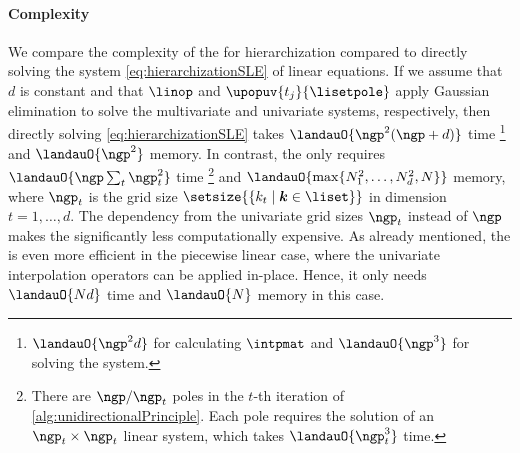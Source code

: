 \paragraph{Complexity}

We compare the complexity of the \up for hierarchization compared
to directly solving the system \eqref{eq:hierarchizationSLE} of
linear equations.
If we assume that $d$ is constant and that
$\linop$ and $\upopuv{t_j}{\lisetpole}$ apply Gaussian elimination to
solve the multivariate and univariate systems, respectively,
then directly solving \eqref{eq:hierarchizationSLE} takes
$\landauO{\ngp^2 (\ngp + d)}$ time%
\footnote{%
  $\landauO{\ngp^2 d}$ for calculating $\intpmat$ and
  $\landauO{\ngp^3}$ for solving the system.
}
and
$\landauO{\ngp^2}$ memory.
In contrast, the \up only requires
$\landauO{\ngp \sum_t \ngp_t^2}$ time%
\footnote{%
  There are $\ngp/\ngp_t$ poles in the
  $t$-th iteration of \cref{alg:unidirectionalPrinciple}.
  Each pole requires the solution of an $\ngp_t \times \ngp_t$ linear system,
  which takes $\landauO{\ngp_t^3}$ time.
}
and $\landauO{\max\{N_1^2, \dotsc, N_d^2, N\}}$ memory,
where $\ngp_t$ is the grid size
$\setsize{\{k_t \mid \*k \in \liset\}}$ in dimension $t = 1, \dotsc, d$.
The dependency from the univariate grid sizes $\ngp_t$ instead of $\ngp$
makes the \up significantly less computationally expensive.
As already mentioned,
the \up is even more efficient in the piecewise linear case,
where the univariate interpolation operators can be applied
in-place.
Hence, it only needs $\landauO{Nd}$ time and
$\landauO{N}$ memory in this case.
